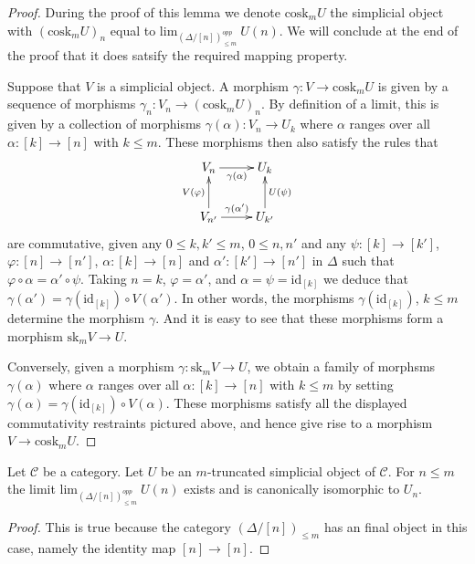 \begin{proof}
During the proof of this lemma we denote $\text{cosk}_mU$ the
simplicial object with $(\text{cosk}_mU)_n$ equal to
$\text{lim}_{(\Delta/[n])_{\leq m}^{opp}}\ U(n)$.
We will conclude at the end of the proof that it does
satsify the required mapping property.

\medskip\noindent
Suppose that $V$ is a simplicial object.
A morphism $\gamma : V \to \text{cosk}_mU$ is given by a sequence
of morphisms $\gamma_n : V_n \to (\text{cosk}_mU)_n$.
By definition of a limit, this is given by a
collection of morphisms $\gamma(\alpha) : V_n \to U_k$
where $\alpha$ ranges over all $\alpha : [k] \to [n]$
with $k \leq m$. These morphisms then also satisfy
the rules that
$$
\xymatrix{
V_n \ar[r]_{\gamma(\alpha)} &  U_k \\
V_{n'} \ar[r]^{\gamma(\alpha')} \ar[u]^{V(\varphi)} & U_{k'} \ar[u]_{U(\psi)}
}
$$
are commutative, given any $0 \leq k, k' \leq m$, $0 \leq n, n'$
and any $\psi : [k] \to [k']$, $\varphi : [n] \to [n']$,
$\alpha : [k] \to [n]$ and $\alpha' : [k'] \to [n']$ in $\Delta$
such that $\varphi \circ \alpha = \alpha' \circ \psi$.
Taking $n = k$, $\varphi = \alpha'$, and $\alpha = \psi = \text{id}_{[k]}$
we deduce that $\gamma(\alpha') = \gamma(\text{id}_{[k]}) \circ V(\alpha')$.
In other words, the morphisms $\gamma(\text{id}_{[k]})$, $k \leq m$
determine the morphism $\gamma$. And it is easy to see that these
morphisms form a morphism $\text{sk}_m V \to U$.

\medskip\noindent
Conversely, given a morphism $\gamma : \text{sk}_m V \to U$,
we obtain a family of morphsms $\gamma(\alpha)$
where $\alpha$ ranges over all $\alpha : [k] \to [n]$
with $k \leq m$ by setting $\gamma(\alpha) =
\gamma(\text{id}_{[k]}) \circ V(\alpha)$. These morphisms
satisfy all the displayed commutativity restraints pictured
above, and hence give rise to a morphism $V \to \text{cosk}_m U$.
\end{proof}

\begin{lemma}
\label{lemma-trivial-cosk}
Let $\mathcal{C}$ be a category.
Let $U$ be an $m$-truncated simplicial object of $\mathcal{C}$.
For $n \leq m$ the limit $\text{lim}_{(\Delta/[n])_{\leq m}^{opp}}\ U(n)$
exists and is canonically isomorphic to $U_n$.
\end{lemma}

\begin{proof}
This is true because the category $(\Delta/[n])_{\leq m}$
has an final object in this case, namely the identity
map $[n] \to [n]$.
\end{proof}

